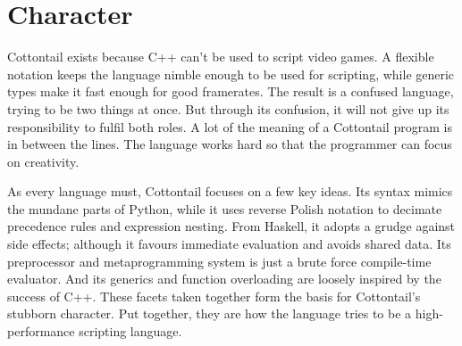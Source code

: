 \section{Character}

Cottontail exists because C++ can't be used to script video games. A
flexible notation keeps the language nimble enough to be used for
scripting, while generic types make it fast enough for good
framerates. The result is a confused language, trying to be two things
at once. But through its confusion, it will not give up its
responsibility to fulfil both roles. A lot of the meaning of a
Cottontail program is in between the lines. The language works hard so
that the programmer can focus on creativity.

As every language must, Cottontail focuses on a few key ideas. Its
syntax mimics the mundane parts of Python, while it uses reverse
Polish notation to decimate precedence rules and expression nesting.
From Haskell, it adopts a grudge against side effects; although it
favours immediate evaluation and avoids shared data. Its preprocessor
and metaprogramming system is just a brute force compile-time
evaluator. And its generics and function overloading are loosely
inspired by the success of C++. These facets taken together form the
basis for Cottontail's stubborn character. Put together, they are how
the language tries to be a high-performance scripting language.

